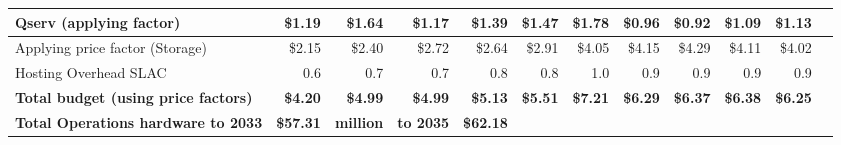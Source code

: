 \begin{longtable} { |p{}  |r  |r  |r  |r  |r  |r  |r  |r  |r  |r  |r |}
{Qserv (applying factor)}&{\$1.19}&{\$1.64}&{\$1.17}&{\$1.39}&{\$1.47}&{\$1.78}&{\$0.96}&{\$0.92}&{\$1.09}&{\$1.13} \\ \hline
{Applying price factor (Storage)}&{\$2.15}&{\$2.40}&{\$2.72}&{\$2.64}&{\$2.91}&{\$4.05}&{\$4.15}&{\$4.29}&{\$4.11}&{\$4.02} \\ \hline
{Hosting Overhead SLAC
}&{0.6}&{0.7}&{0.7}&{0.8}&{0.8}&{1.0}&{0.9}&{0.9}&{0.9}&{0.9} \\ \hline
\textbf{Total budget (using price factors)}&\textbf{\$4.20}&\textbf{\$4.99}&\textbf{\$4.99}&\textbf{\$5.13}&\textbf{\$5.51}&\textbf{\$7.21}&\textbf{\$6.29}&\textbf{\$6.37}&\textbf{\$6.38}&\textbf{\$6.25} \\ \hline
\textbf{Total Operations hardware to 2033}&\textbf{\$57.31}&\textbf{million}&\textbf{to 2035}&\textbf{\$62.18}&&&&&& \\ \hline
\end{longtable} \normalsize
